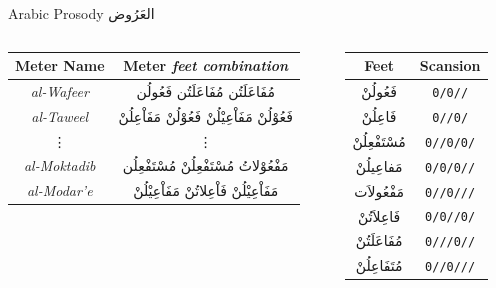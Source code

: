\begin{frame}[fragile]{Arabic Prosody \textarabic{العَرُوض}}
\begin{columns}
\begin{column}{.7\textwidth}
		\begin{table}
		\small
				\begin{tabular}[h!]{|c|c|} 
			\hline
			\textbf{Meter Name} & \textbf{Meter} \small{\textit{feet combination}} \\ 
			\hline
			\textit{al-Wafeer}    & \textarabic{مُفَاعَلَتُن مُفَاعَلَتُن فَعُولُن} \\ %
			\textit{al-Taweel}    & \textarabic{فَعُوْلُنْ مَفَاْعِيْلُنْ فَعُوْلُنْ مَفَاْعِلُنْ} \\ %
			\vdots                &  \vdots\\
			\textit{al-Moktadib}  & \textarabic{مَفْعُوْلاتُ مُسْتَفْعِلُنْ مُسْتَفْعِلُن} \\
			\textit{al-Modar'e}   & \textarabic{مَفَاْعِيْلُنْ فَاْعِلاتُنْ مَفَاْعِيْلُنْ} \\
			\hline
		\end{tabular}
		\end{table}
	\end{column}%
		\hfill%
		\begin{column}{.3 \textwidth}
			\begin{table}
				\small
			\begin{tabular}{|c|c|} \hline
			\textbf{Feet} & \textbf{Scansion} \\
			\hline
			\textarabic{فَعُولُنْ}  & \texttt{0/0//}\\
			\textarabic{فَاعِلُنْ}  & \texttt{0//0/}\\
			\textarabic{مُسْتَفْعِلُنْ}& \texttt{0//0/0/}\\
			\textarabic{مَفاعِيلُنْ}& \texttt{0/0/0//}\\
			\textarabic{مَفْعُولاَت} & \texttt{0//0///}\\
			\textarabic{فَاعِلاَتُنْ} & \texttt{0/0//0/}\\
			\textarabic{مُفَاعَلَتُنْ}& \texttt{0///0//}\\
			\textarabic{مُتَفَاعِلُنْ}& \texttt{0//0///}\\
			\hline
		\end{tabular}
		\end{table}		

	\end{column}
\end{columns}
\end{frame}


